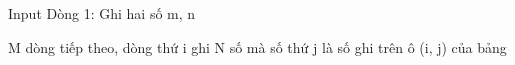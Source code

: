 Input
Dòng 1: Ghi hai số m, n

M dòng tiếp theo, dòng thứ i ghi N số mà số thứ j là số ghi trên ô (i, j) của bảng